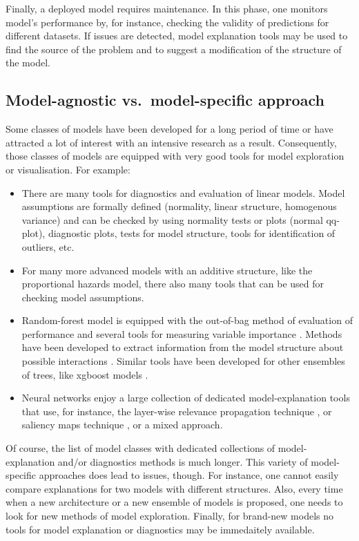 \documentclass[]{krantz}
\providecommand{\tightlist}{%
  \setlength{\itemsep}{0pt}\setlength{\parskip}{0pt}}
\theoremstyle{definition}
\theoremstyle{definition}
\theoremstyle{definition}
\theoremstyle{remark}
\begin{document}
Finally, a deployed model requires maintenance. In this phase, one
monitors model's performance by, for instance, checking the validity of
predictions for different datasets. If issues are detected, model
explanation tools may be used to find the source of the problem and to
suggest a modification of the structure of the model.

\hypertarget{model-agnostic-vs.model-specific-approach}{%
\subsection{Model-agnostic vs.~model-specific
approach}\label{model-agnostic-vs.model-specific-approach}}

Some classes of models have been developed for a long period of time or
have attracted a lot of interest with an intensive research as a result.
Consequently, those classes of models are equipped with very good tools
for model exploration or visualisation. For example:

\begin{itemize}
\tightlist
\item
  There are many tools for diagnostics and evaluation of linear models.
  Model assumptions are formally defined (normality, linear structure,
  homogenous variance) and can be checked by using normality tests or
  plots (normal qq-plot), diagnostic plots, tests for model structure,
  tools for identification of outliers, etc.
\item
  For many more advanced models with an additive structure, like the
  proportional hazards model, there also many tools that can be used for
  checking model assumptions.
\item
  Random-forest model is equipped with the out-of-bag method of
  evaluation of performance and several tools for measuring variable
  importance \citep{R-randomForest}. Methods have been developed to
  extract information from the model structure about possible
  interactions \citep{R-randomForestExplainer}. Similar tools have been
  developed for other ensembles of trees, like xgboost models
  \citep{R-xgboostExplainer}.
\item
  Neural networks enjoy a large collection of dedicated
  model-explanation tools that use, for instance, the layer-wise
  relevance propagation technique \citep{BachLWRP}, or saliency maps
  technique \citep{SaliencyMaps}, or a mixed approach.
\end{itemize}

Of course, the list of model classes with dedicated collections of
model-explanation and/or diagnostics methods is much longer. This
variety of model-specific approaches does lead to issues, though. For
instance, one cannot easily compare explanations for two models with
different structures. Also, every time when a new architecture or a new
ensemble of models is proposed, one needs to look for new methods of
model exploration. Finally, for brand-new models no tools for model
explanation or diagnostics may be immedaitely available.
\end{document}
